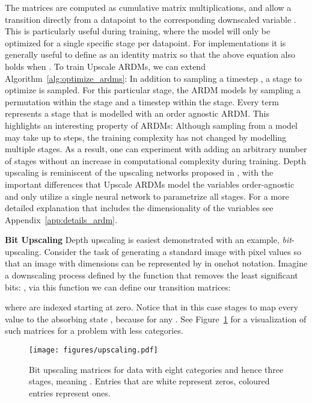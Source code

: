 \documentclass{article} \usepackage{iclr2022_conference,times}
\begin{document}
The matrices  are computed as cumulative matrix multiplications, and allow a transition directly from a datapoint  to the corresponding downscaled variable . This is particularly useful during training, where the model will only be optimized for a single specific stage per datapoint. For implementations it is generally useful to define  as an identity matrix so that the above equation also holds when . To train Upscale ARDMs, we can extend Algorithm~\ref{alg:optimize_ardms}: In addition to sampling a timestep , a stage  to optimize is sampled. For this particular stage, the ARDM models  by sampling a permutation  within the stage and a timestep  within the stage. Every term  represents a stage that is modelled with an order agnostic ARDM. This highlights an interesting property of ARDMs: Although sampling from a model may take up to  steps, the training complexity has not changed by modelling multiple stages. As a result, one can experiment with adding an arbitrary number of stages without an increase in computational complexity during training. Depth upscaling is reminiscent of the upscaling networks proposed in \citep{kalchbrenner2018efficientneural,menick2019SPN}, with the important differences that Upscale ARDMs model the variables order-agnostic and only utilize a single neural network to parametrize all stages. For a more detailed explanation that includes the dimensionality of the variables  see Appendix~\ref{app:details_ardm}.

\textbf{Bit Upscaling} \hspace{.2cm}
Depth upscaling is easiest demonstrated with an example, \textit{bit}-upscaling. Consider the task of generating a standard image with pixel values  so that an image with  dimensions can be represented by  in onehot notation.
Imagine a downscaling process defined by the function that removes the  least significant bits: , via this function we can define our transition matrices:

where  are indexed starting at zero. Notice that in this case  stages to map every value to the absorbing state , because  for any . See Figure~\ref{fig:upscaling} for a visualization of such matrices for a problem with less categories.

\begin{figure}[H]
    \vspace{-.1cm}
    \centering
    \texttt{[image: figures/upscaling.pdf]}
    \vspace{-.3cm}
    \caption{Bit upscaling matrices for data with eight categories and hence three stages, meaning . Entries that are white represent zeros, coloured entries represent ones.}
    \label{fig:upscaling}
    \vspace{-.3cm}
\end{figure}
\end{document}
